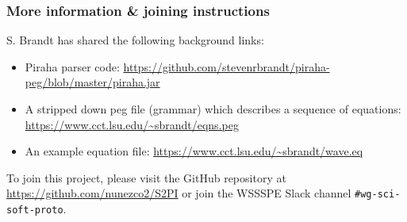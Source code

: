 \subsubsection{More information \& joining instructions}

S. Brandt has shared the following background links:

\begin{itemize}
  \item Piraha parser code: \url{https://github.com/stevenrbrandt/piraha-peg/blob/master/piraha.jar}
  \item A stripped down peg file (grammar) which describes a sequence of equations:
\url{https://www.cct.lsu.edu/~sbrandt/eqns.peg}
  \item An example equation file: \url{https://www.cct.lsu.edu/~sbrandt/wave.eq}
\end{itemize}

To join this project, please visit the GitHub repository at
\url{https://github.com/nunezco2/S2PI} or join the WSSSPE Slack channel
\texttt{\#wg-sci-soft-proto}.
